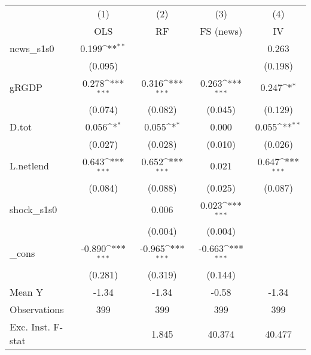 {
\def\sym#1{\ifmmode^{#1}\else\(^{#1}\)\fi}
\begin{tabular}{l*{4}{c}}
\toprule
            &\multicolumn{1}{c}{(1)}&\multicolumn{1}{c}{(2)}&\multicolumn{1}{c}{(3)}&\multicolumn{1}{c}{(4)}\\
            &\multicolumn{1}{c}{OLS}&\multicolumn{1}{c}{RF}&\multicolumn{1}{c}{FS (news)}&\multicolumn{1}{c}{IV}\\
\midrule
news\_s1s0   &       0.199\sym{**} &                     &                     &       0.263         \\
            &     (0.095)         &                     &                     &     (0.198)         \\
\addlinespace
gRGDP       &       0.278\sym{***}&       0.316\sym{***}&       0.263\sym{***}&       0.247\sym{*}  \\
            &     (0.074)         &     (0.082)         &     (0.045)         &     (0.129)         \\
\addlinespace
D.tot       &       0.056\sym{*}  &       0.055\sym{*}  &       0.000         &       0.055\sym{**} \\
            &     (0.027)         &     (0.028)         &     (0.010)         &     (0.026)         \\
\addlinespace
L.netlend   &       0.643\sym{***}&       0.652\sym{***}&       0.021         &       0.647\sym{***}\\
            &     (0.084)         &     (0.088)         &     (0.025)         &     (0.087)         \\
\addlinespace
shock\_s1s0  &                     &       0.006         &       0.023\sym{***}&                     \\
            &                     &     (0.004)         &     (0.004)         &                     \\
\addlinespace
\_cons      &      -0.890\sym{***}&      -0.965\sym{***}&      -0.663\sym{***}&                     \\
            &     (0.281)         &     (0.319)         &     (0.144)         &                     \\
\midrule
Mean Y      &       -1.34         &       -1.34         &       -0.58         &       -1.34         \\
Observations&         399         &         399         &         399         &         399         \\
Exc. Inst. F-stat&                     &       1.845         &      40.374         &      40.477         \\
\bottomrule
\end{tabular}
}
